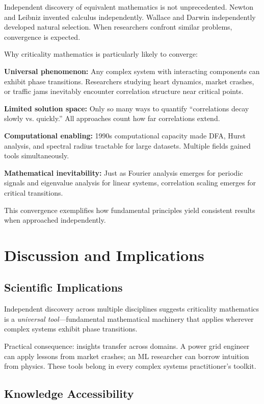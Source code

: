 \documentclass[11pt]{article}
\begin{document}
Independent discovery of equivalent mathematics is not unprecedented. Newton and Leibniz invented calculus independently. Wallace and Darwin independently developed natural selection. When researchers confront similar problems, convergence is expected.

Why criticality mathematics is particularly likely to converge:

\textbf{Universal phenomenon:} Any complex system with interacting components can exhibit phase transitions. Researchers studying heart dynamics, market crashes, or traffic jams inevitably encounter correlation structure near critical points.

\textbf{Limited solution space:} Only so many ways to quantify ``correlations decay slowly vs. quickly.'' All approaches count how far correlations extend.

\textbf{Computational enabling:} 1990s computational capacity made DFA, Hurst analysis, and spectral radius tractable for large datasets. Multiple fields gained tools simultaneously.

\textbf{Mathematical inevitability:} Just as Fourier analysis emerges for periodic signals and eigenvalue analysis for linear systems, correlation scaling emerges for critical transitions.

This convergence exemplifies how fundamental principles yield consistent results when approached independently.

\section{Discussion and Implications}

\subsection{Scientific Implications}

Independent discovery across multiple disciplines suggests criticality mathematics is a \textit{universal tool}---fundamental mathematical machinery that applies wherever complex systems exhibit phase transitions.

Practical consequence: insights transfer across domains. A power grid engineer can apply lessons from market crashes; an ML researcher can borrow intuition from physics. These tools belong in every complex systems practitioner's toolkit.

\subsection{Knowledge Accessibility}
\end{document}
